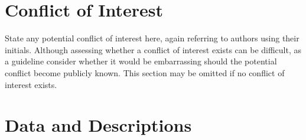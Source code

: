 \documentclass{ledger}
\begin{document}
\section*{Conflict of Interest}

State any potential conflict of interest here, again referring to authors using their initials.  Although assessing whether a conflict of interest exists can be difficult, as a guideline consider whether it would be embarrassing should the potential conflict become publicly known.  This section may be omitted if no conflict of interest exists.







\newpage 	

\appendix
\setcounter{section}{0}
\section{Data and Descriptions}

\vspace{12pt}
\begin{table}[h]
\begin{center} 



\caption{A table in an appendix} \label{AppendixTable}
\end{center}
\end{table} 


\thispagestyle{pagelast}





\end{document}
